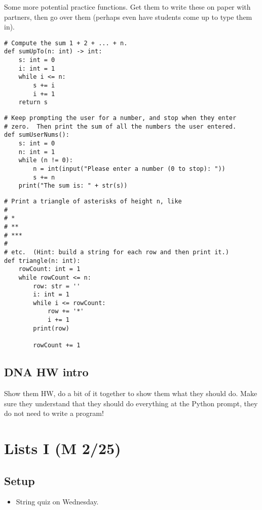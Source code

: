 \documentclass{article}
\newcommand{\ready}{\textcolor{Green}{\Checkmark}\xspace}
\begin{document}
Some more potential practice functions.  Get them to write these on
paper with partners, then go over them (perhaps even have students
come up to type them in).

\begin{verbatim}
# Compute the sum 1 + 2 + ... + n.
def sumUpTo(n: int) -> int:
    s: int = 0
    i: int = 1
    while i <= n:
        s += i
        i += 1
    return s
\end{verbatim}

\begin{verbatim}
# Keep prompting the user for a number, and stop when they enter
# zero.  Then print the sum of all the numbers the user entered.
def sumUserNums():
    s: int = 0
    n: int = 1
    while (n != 0):
        n = int(input("Please enter a number (0 to stop): "))
        s += n
    print("The sum is: " + str(s))
\end{verbatim}

\begin{verbatim}
# Print a triangle of asterisks of height n, like
#
# *
# **
# ***
#
# etc.  (Hint: build a string for each row and then print it.)
def triangle(n: int):
    rowCount: int = 1
    while rowCount <= n:
        row: str = ''
        i: int = 1
        while i <= rowCount:
            row += '*'
            i += 1
        print(row)

        rowCount += 1
\end{verbatim}

\subsection*{DNA HW intro}

Show them HW, do a bit of it together to show them what they should
do.  Make sure they understand that they should do everything at the
Python prompt, they do not need to write a program!

\newpage
\section{\ready Lists I (M 2/25)}

\subsection*{Setup}
\begin{itemize}
\item String quiz on Wednesday.
\end{itemize}
\end{document}
